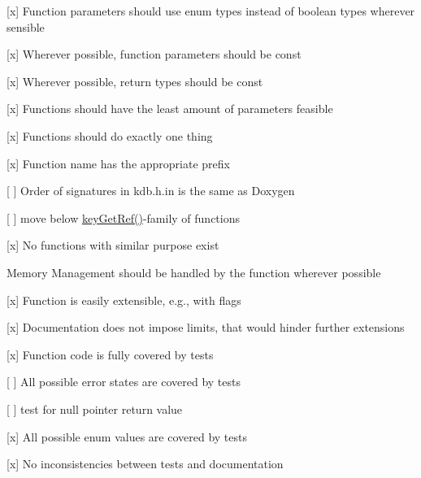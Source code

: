 \begin{DoxyItemize}
\item \mbox{[}x\mbox{]} Function parameters should use enum types instead of boolean types wherever sensible
\item \mbox{[}x\mbox{]} Wherever possible, function parameters should be {\ttfamily const}
\item \mbox{[}x\mbox{]} Wherever possible, return types should be {\ttfamily const}
\item \mbox{[}x\mbox{]} Functions should have the least amount of parameters feasible
\end{DoxyItemize}


\begin{DoxyItemize}
\item \mbox{[}x\mbox{]} Functions should do exactly one thing
\item \mbox{[}x\mbox{]} Function name has the appropriate prefix
\item \mbox{[} \mbox{]} Order of signatures in kdb.\+h.\+in is the same as Doxygen
\begin{DoxyItemize}
\item \mbox{[} \mbox{]} move below {\ttfamily \hyperlink{group__key_ga4aabc4272506dd63161db2bbb42de8ae}{key\+Get\+Ref()}}-\/family of functions
\end{DoxyItemize}
\item \mbox{[}x\mbox{]} No functions with similar purpose exist
\end{DoxyItemize}


\begin{DoxyItemize}
\item Memory Management should be handled by the function wherever possible
\end{DoxyItemize}


\begin{DoxyItemize}
\item \mbox{[}x\mbox{]} Function is easily extensible, e.\+g., with flags
\item \mbox{[}x\mbox{]} Documentation does not impose limits, that would hinder further extensions
\end{DoxyItemize}


\begin{DoxyItemize}
\item \mbox{[}x\mbox{]} Function code is fully covered by tests
\item \mbox{[} \mbox{]} All possible error states are covered by tests
\begin{DoxyItemize}
\item \mbox{[} \mbox{]} test for null pointer return value
\end{DoxyItemize}
\item \mbox{[}x\mbox{]} All possible enum values are covered by tests
\item \mbox{[}x\mbox{]} No inconsistencies between tests and documentation
\end{DoxyItemize}